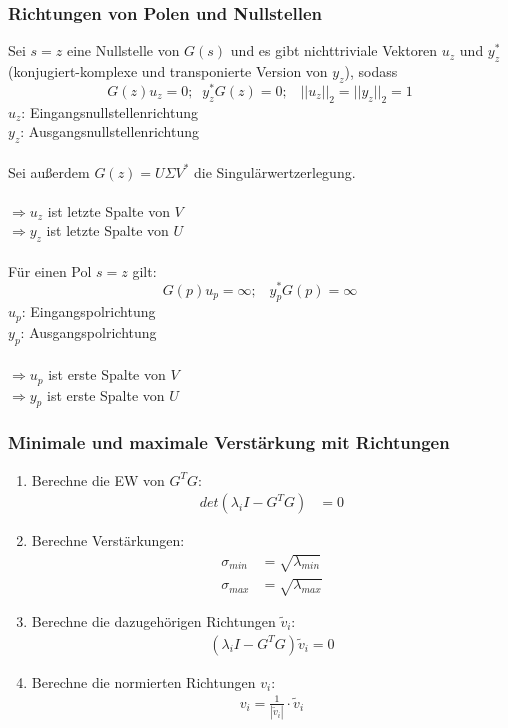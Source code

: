 \documentclass[a4paper,twocolumn,10pt]{article}
\begin{document}
\subsubsection{Richtungen von Polen und Nullstellen}
Sei $s=z$ eine Nullstelle von $G(s)$ und es gibt nichttriviale Vektoren $u_z$ und $y_z^*$ (konjugiert-komplexe und transponierte Version von $y_z$), sodass
\begin{equation*}
G(z)u_z=0;\;\;y_z^*G(z)=0;\;\;\;||u_z||_2=||y_z||_2=1
\end{equation*}
$u_z$: Eingangsnullstellenrichtung\\
$y_z$: Ausgangsnullstellenrichtung\\\\
Sei außerdem $G(z)=U\Sigma V^*$ die Singulärwertzerlegung.\\\\
$\Rightarrow u_z$ ist letzte Spalte von $V$\\
$\Rightarrow y_z$ ist letzte Spalte von $U$\\\\
Für einen Pol $s=z$ gilt:
\begin{equation*}
G(p)u_p=\infty;\;\;\;y_p^*G(p)=\infty
\end{equation*}
$u_p$: Eingangspolrichtung\\
$y_p$: Ausgangspolrichtung\\\\
$\Rightarrow u_p$ ist erste Spalte von $V$\\
$\Rightarrow y_p$ ist erste Spalte von $U$

\subsubsection{Minimale und maximale Verstärkung mit Richtungen}
\begin{enumerate}
\item Berechne die EW von $G^TG$:
\begin{align*}
det(\lambda_iI-G^TG)&=0
\end{align*}
\item Berechne Verstärkungen:
\begin{align*}
\sigma_{min}&=\sqrt{\lambda_{min}}\\
\sigma_{max}&=\sqrt{\lambda_{max}}
\end{align*}
\item Berechne die dazugehörigen Richtungen $\tilde{v}_i$:
\begin{align*}
(\lambda_iI-G^TG)\tilde{v}_i=0
\end{align*}
\item Berechne die normierten Richtungen $v_i$:
\begin{align*}
v_i=\frac{1}{|\tilde{v}_i|}\cdot\tilde{v}_i
\end{align*}
\end{enumerate}
\end{document}
